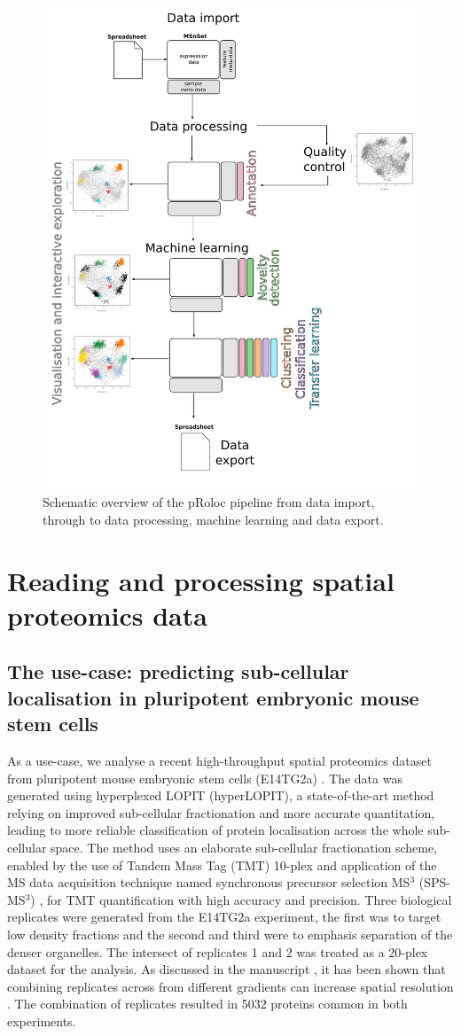\begin{figure}[!ht]
  \centering
  \includegraphics[width=.5\textwidth]{./Figures/overview.pdf}
  \caption{Schematic overview of the pRoloc pipeline from data import, through to data processing, machine learning and data export.}
  \label{fig:overview}
\end{figure}


\section*{Reading and processing spatial proteomics data}

\subsection*{The use-case: predicting sub-cellular localisation in pluripotent embryonic mouse stem cells}

As a use-case, we analyse a recent high-throughput spatial proteomics
dataset from pluripotent mouse embryonic stem cells (E14TG2a)
\cite{hyper}. The data was generated using hyperplexed LOPIT
(hyperLOPIT), a state-of-the-art method relying on improved
sub-cellular fractionation and more accurate quantitation, leading to
more reliable classification of protein localisation across the whole
sub-cellular space. The method uses an elaborate sub-cellular
fractionation scheme, enabled by the use of Tandem Mass Tag (TMT)
\cite{Thompson:2003} 10-plex and application of the MS data
acquisition technique named synchronous precursor selection MS$^3$
(SPS-MS$^3$) \cite{McAlister:2014}, for TMT quantification with high
accuracy and precision. Three biological replicates were generated
from the E14TG2a experiment, the first was to target low density
fractions and the second and third were to emphasis separation of the
denser organelles.  The intersect of replicates 1 and 2 was treated as
a 20-plex dataset for the analysis.  As discussed in the manuscript
\cite{hyper}, it has been shown that combining replicates across from
different gradients can increase spatial resolution
\cite{Trotter:2010}. The combination of replicates resulted in 5032
proteins common in both experiments.

